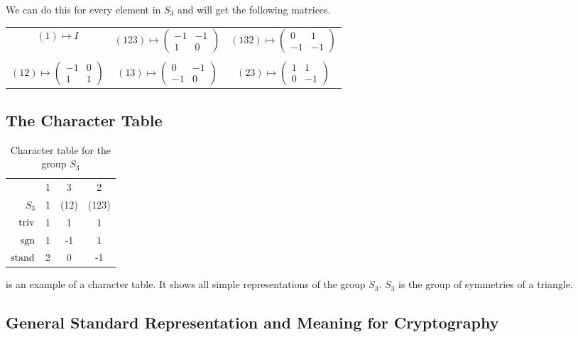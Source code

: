 We can do this for every element in $S_3$ and will get the following matrices.
\begin{table}[h]
    \centering
    \begin{tabular}{c c c}
        $(1) \mapsto I$ & $(123) \mapsto \begin{pmatrix}
            -1 & -1 \\
            1 & 0
        \end{pmatrix}$ & $(132) \mapsto \begin{pmatrix}
            0 & 1 \\
            -1 & -1
        \end{pmatrix}$ \\\\ $(12) \mapsto \begin{pmatrix}
            -1 & 0 \\
            1 & 1
        \end{pmatrix}$ & $(13) \mapsto \begin{pmatrix}
            0 & -1 \\
            -1 & 0
        \end{pmatrix}$ & $(23) \mapsto \begin{pmatrix}
            1 & 1 \\
            0 & -1
        \end{pmatrix}$
    \end{tabular}
\end{table}


\subsection{The Character Table}


\begin{table}
    \centering

    \begin{tabular}{r | c  c  c}
                    & 1 & 3     & 2     \\
        $S_3$       & 1 & (12)  & (123) \\ \hline
        $\operatorname{triv}$     & 1 & 1     & 1     \\
        $\operatorname{sgn}$      & 1 & -1    & 1     \\
        $\operatorname{stand}$    & 2 & 0     & -1
    \end{tabular}

    \caption{Character table for the group $S_3$}
    \label{tab:reprep.char.table}
\end{table}

 is an example of a character table.
It shows all simple representations of the group $S_3$.
$S_3$ is the group of symmetries of a triangle.

\subsection{General Standard Representation and Meaning for Cryptography}
